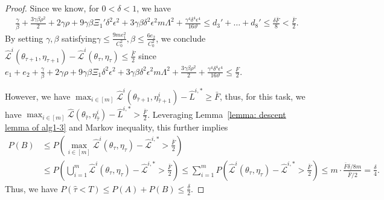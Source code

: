 \documentclass[twoside]{article} %
\theoremstyle{plain}
\theoremstyle{definition}
\theoremstyle{remark}
\newcommand{\hL}{\hat{L}}
\newcommand{\htau}{\hat{\tau}}
\newcommand{\fhL}{\hat{\mathcal{L}}}
\begin{document}
\begin{proof}
Since we know, for ${0<\delta<1}$, we have
\begin{align}
    \frac{\gamma}{\beta}+\frac{3\gamma\beta\rho^2}{2}+2\gamma\rho+9\gamma\beta\Xi_1'\delta^2\epsilon^2+3\gamma\beta\delta^2\epsilon^2m\Lambda^2+\frac{\gamma^4\delta^4\epsilon^4}{16\vartheta}\leq d_3'+\dots+d_8'\leq\frac{\delta \bar{F}}{8}<\frac{\bar{F}}{2}.
\end{align}
By setting $\gamma,\beta$ satisfying${\gamma\leq \frac{9me_1^2}{C_0^2},\beta\leq \frac{6e_2}{C_0^2}}$,
we conclude $ \fhL^i(\theta_{\tau+1},\eta_{\tau+1})-\fhL^i(\theta_\tau,\eta_\tau)\leq \frac{\bar{F}}{2}$ since $e_1+e_2+\frac{\gamma}{\beta}+2\gamma\rho+9\gamma\beta\Xi_1\delta^2\epsilon^2+3\gamma\beta\delta^2\epsilon^2m\Lambda^2+\frac{3\gamma\beta\rho^2}{2}+\frac{\gamma^4\delta^4\epsilon^4}{16\vartheta}\leq \frac{F}{2}$.

However, we have $\max_{i\in[m]}\fhL^i(\theta_{\htau+1},\eta^i_{\htau+1})-\hL^{i,*}\geq \bar{F}$, thus, for this task, we have $\max_{i\in [m]}\fhL(\theta_{\htau},\eta_{\htau}^i)-\hL^{i,*}>\frac{\bar{F}}{2}$.
Leveraging Lemma~\ref{lemma: descent lemma of alg1-3} and Markov inequality, this further implies
\begin{align}
    P(B)&\leq P(\max_{i\in [m]}\fhL^i(\theta_{\tau},\eta_{\tau})-\fhL^{i,*}>\frac{\bar{F}}{2})\nonumber\\
    &\leq P(\bigcup_{i=1}^{m} \fhL^i(\theta_{\tau},\eta_{\tau})-\fhL^{i,*}>\frac{\bar{F}}{2}) \leq \sum_{i=1}^{m} P(\fhL^i(\theta_{\tau},\eta_{\tau})-\fhL^{i,*}>\frac{\bar{F}}{2})
    \leq m\cdot\frac{\bar{F}\delta/8m}{\bar{F}/2}= \frac{\delta}{4}.\nonumber
\end{align}
Thus, we have $P(\htau < T)\leq P(A)+P(B)\leq \frac{\delta}{2}$. 


\end{proof}
\end{document}
